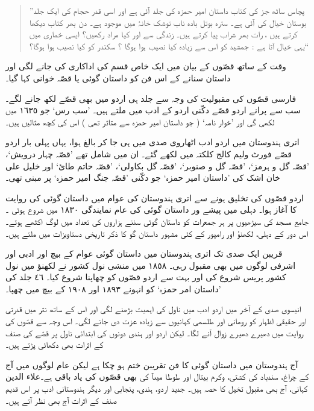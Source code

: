 \documentclass[a4paper]{article}
\begin{document}
\begin{quote}
”پچاس ساٹھ جز کی کتاب داستان امیر حمزہ کی جلد آئی ہے اور اسی قدر حجام کی ایک جلد بوستان خیال کی آئی ہے۔ سترہ بوتل بادہ ناب توشک خانۂ میں موجود ہے۔ دن بھر کتاب دیکھا کرتے ہیں ، رات بھر شراب پیا کرتے ہیں۔ زندگی سے اور کیا مراد رکھیں؟ ایسی خماری میں یہی خیال آتا ہے : جمشید کو اس سے زیادہ کیا نصیب ہوا ہوگا ؟ سکندر کو کیا نصیب ہوا ہوگا؟“
\end{quote}

وقت کے ساتھ قصّوں کے بیان  میں ایک خاص قسم کی اداکاری کی جانے لگی اور داستان سنانے کے اس فن کو داستان گوئی یا قصّہ خوانی  کہا  گیا۔

فارسی قصّوں کی مقبولیت کی وجہ سے جلد ہی اردو میں بھی قصّے لکھ جانے لگے۔ سب سے پرانے اردو قصّے دکّنی اردو کے  ادب میں ملتے ہیں۔ ’سب رس‘ جو ١٦٣٥ میں لکھی گی اور ’خوار نامہ‘ ( جو داستان  امیر حمزہ سے متاثر تھی ) اس کی کچھ مثالیں ہیں۔

اتری ہندوستان میں اردو ادب اٹھاروی صدی میں ہی جا کر بالغ ہوا، یہاں پہلی بار اردو قصّے فورٹ ولیم کالج کلکتہ میں لکھے گئے۔ ان میں شامل تھے ’قصّہ چہار درویش‘، ’قصّہ گل و ہرمز‘، ’قصّہ گل و صنوبر‘، ’قصّہ گل بکاولی‘، ’قصّہ حاتم طائ‘ اور خلیل علی خان اشک کی ’داستان امیر حمزہ‘ جو دکّنی ’قصّہ جنگ امیر حمزہ‘ پر مبنی تھی۔

اردو قصّوں کی تخلیق ہونے سے اتری ہندوستان کی عوام میں داستان گوئی کی روایت کا آغاز ہوا۔ دہلی  میں  پیشے ور داستان گوئی کی عام نمایندگی ١٨٣٠ میں شروع ہوئی ۔ جامع مسجد کی سیڑھیوں پر ہر  جمعرات کو داستان گوئی سننے ہزاروں کی تعداد میں لوگ اکٹھے ہوتے۔ اس دور کے  دہلی، لکھنؤ اور رامپور کے کئی  مشہور داستان گو کا ذکر تاریخی دستاویزات میں  ملتے ہیں۔

قریبن ایک صدی تک اتری ہندوستان میں داستان گوئی عوام کے بیچ اور ادبی اور اشرفی لوگوں میں بھی مقبول رہی۔ ١٨٥٨ میں منشی نول کشور نے لکھنؤ میں نول کشور پریس شروع کی اور بہت سے اردو قصّوں کو چھاپنا شروع کیا۔ ٤٦ جلد کی ’داستان امر حمزہ‘ کو انہونے ١٨٩٣ اور ١٩٠٨ کے بیچ میں چھپا۔

انیسوی صدی کے آخر میں اردو ادب میں ناول کی اہمیت بڑھنے لگی اور اس کے ساتھ نثر میں قدرتی اور حقیقی اظہار کو رومانی اور طلسمی کہانیوں سے زیادہ عزت دی جانے لگی۔ اس وجہ سے قصّوں کی روایت میں دھیرے  دھیرے زوال آنے لگا۔
لیکن اردو اور ہندی دونوں کی ابتدائی ناول پر قصّے کی صنف کے اثرات بھی دکھائی پڑتے ہیں۔

 آج ہندوستان میں داستان گوئی کا فن تقریبن ختم ہو چکا ہے لیکن عام لوگوں میں آج بھی قصّوں کی یاد باقی ہے۔علاء الدين‎ کے چراغ، سندباد کی کشتی، وکرم بیتال اور طوطا میںآ کی کہانی، آج بھی مقبول تخیل کا حصہ  ہیں۔ جدید اردو، ہندی، پنجابی اور دیگر ہندوستانی ادب پر اس قدیم صنف کے اثرات آج بھی نظر آتے ہیں۔
\end{document}
